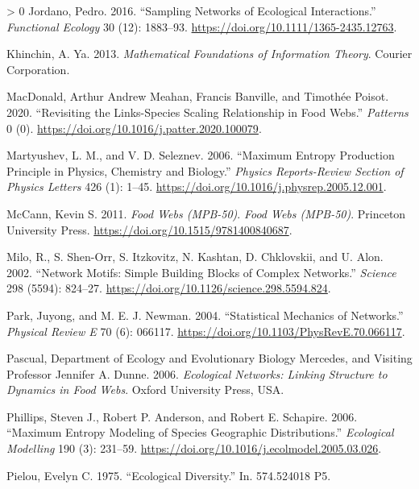 \documentclass[11pt]{article}
\newlength{\cslhangindent}
\newenvironment{CSLReferences}[3] %
 {%
  \setlength{\parindent}{0pt}
  \ifodd #1 \everypar{\setlength{\hangindent}{\cslhangindent}}\ignorespaces\fi
  \ifnum #2 > 0
  \setlength{\parskip}{#2\baselineskip}
  \fi
 }%
 {}
\begin{document}
\begin{CSLReferences}{1}{0}
\leavevmode\hypertarget{ref-Jordano2016SamNeta}{}%
Jordano, Pedro. 2016. {``Sampling Networks of Ecological
Interactions.''} \emph{Functional Ecology} 30 (12): 1883--93.
\url{https://doi.org/10.1111/1365-2435.12763}.

\leavevmode\hypertarget{ref-Khinchin2013MatFou}{}%
Khinchin, A. Ya. 2013. \emph{Mathematical Foundations of Information
Theory}. Courier Corporation.

\leavevmode\hypertarget{ref-MacDonald2020RevLin}{}%
MacDonald, Arthur Andrew Meahan, Francis Banville, and Timothée Poisot.
2020. {``Revisiting the Links-Species Scaling Relationship in Food
Webs.''} \emph{Patterns} 0 (0).
\url{https://doi.org/10.1016/j.patter.2020.100079}.

\leavevmode\hypertarget{ref-Martyushev2006MaxEnt}{}%
Martyushev, L. M., and V. D. Seleznev. 2006. {``Maximum Entropy
Production Principle in Physics, Chemistry and Biology.''} \emph{Physics
Reports-Review Section of Physics Letters} 426 (1): 1--45.
\url{https://doi.org/10.1016/j.physrep.2005.12.001}.

\leavevmode\hypertarget{ref-McCann2011FooWeb}{}%
McCann, Kevin S. 2011. \emph{Food Webs (MPB-50)}. \emph{Food Webs
(MPB-50)}. Princeton University Press.
\url{https://doi.org/10.1515/9781400840687}.

\leavevmode\hypertarget{ref-Milo2002NetMot}{}%
Milo, R., S. Shen-Orr, S. Itzkovitz, N. Kashtan, D. Chklovskii, and U.
Alon. 2002. {``Network Motifs: Simple Building Blocks of Complex
Networks.''} \emph{Science} 298 (5594): 824--27.
\url{https://doi.org/10.1126/science.298.5594.824}.

\leavevmode\hypertarget{ref-Park2004StaMeca}{}%
Park, Juyong, and M. E. J. Newman. 2004. {``Statistical Mechanics of
Networks.''} \emph{Physical Review E} 70 (6): 066117.
\url{https://doi.org/10.1103/PhysRevE.70.066117}.

\leavevmode\hypertarget{ref-Pascual2006EcoNeta}{}%
Pascual, Department of Ecology and Evolutionary Biology Mercedes, and
Visiting Professor Jennifer A. Dunne. 2006. \emph{Ecological Networks:
Linking Structure to Dynamics in Food Webs}. Oxford University Press,
USA.

\leavevmode\hypertarget{ref-Phillips2006MaxEnta}{}%
Phillips, Steven J., Robert P. Anderson, and Robert E. Schapire. 2006.
{``Maximum Entropy Modeling of Species Geographic Distributions.''}
\emph{Ecological Modelling} 190 (3): 231--59.
\url{https://doi.org/10.1016/j.ecolmodel.2005.03.026}.

\leavevmode\hypertarget{ref-Pielou1975EcoDiv}{}%
Pielou, Evelyn C. 1975. {``Ecological Diversity.''} In. 574.524018 P5.


\end{CSLReferences}
\end{document}
